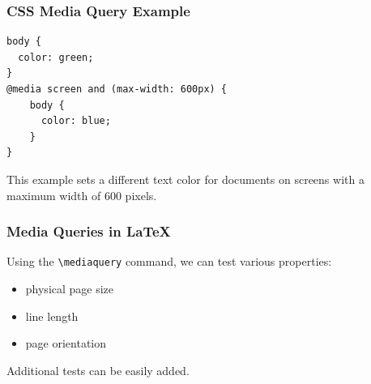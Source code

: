 




\begin{frame}[fragile]
\frametitle{CSS Media Query Example}
\begin{verbatim}
body {
  color: green;
}
@media screen and (max-width: 600px) {
    body {
      color: blue;
    }
}
\end{verbatim}
\end{frame}

This example sets a different text color for documents on screens with a maximum width of 600 pixels.


          
\begin{frame}[fragile]
  \frametitle{Media Queries in \LaTeX}
    Using the \verb|\mediaquery| command, we can test various properties:
  
    \begin{itemize}
  \item physical page size
  \item line length
  \item page orientation
\end{itemize}

Additional tests can be easily added.

\end{frame}


